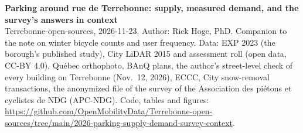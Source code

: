 \documentclass[11pt,a4paper]{article}
\begin{document}
{\LARGE\textbf{Parking around rue de Terrebonne: supply, measured demand, and the survey\textquoteright{}s answers in context}}\\[4pt]
{\small Terrebonne-open-sources, 2026-11-23. Author: Rick Hoge, PhD. Companion to the note on winter bicycle counts and user frequency. Data: EXP 2023 (the borough\textquoteright{}s published study), City LiDAR 2015 and assessment roll (open data, CC-BY 4.0), Québec orthophoto, BAnQ plans, the author\textquoteright{}s street-level check of every building on Terrebonne (Nov.~12, 2026), ECCC, City snow-removal transactions, the anonymized file of the survey of the Association des piétons et cyclistes de NDG (APC-NDG). Code, tables and figures: \url{https://github.com/OpenMobilityData/Terrebonne-open-sources/tree/main/2026-parking-supply-demand-survey-context}.}
\end{document}
